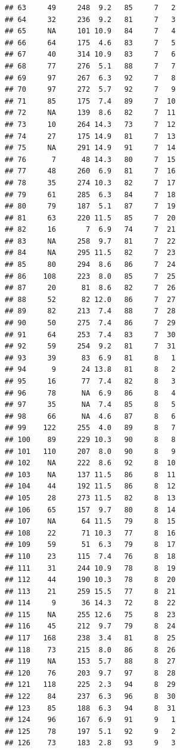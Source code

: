 \documentclass[
]{book}
\begin{document}
\begin{verbatim}
## 63     49     248  9.2   85     7   2
## 64     32     236  9.2   81     7   3
## 65     NA     101 10.9   84     7   4
## 66     64     175  4.6   83     7   5
## 67     40     314 10.9   83     7   6
## 68     77     276  5.1   88     7   7
## 69     97     267  6.3   92     7   8
## 70     97     272  5.7   92     7   9
## 71     85     175  7.4   89     7  10
## 72     NA     139  8.6   82     7  11
## 73     10     264 14.3   73     7  12
## 74     27     175 14.9   81     7  13
## 75     NA     291 14.9   91     7  14
## 76      7      48 14.3   80     7  15
## 77     48     260  6.9   81     7  16
## 78     35     274 10.3   82     7  17
## 79     61     285  6.3   84     7  18
## 80     79     187  5.1   87     7  19
## 81     63     220 11.5   85     7  20
## 82     16       7  6.9   74     7  21
## 83     NA     258  9.7   81     7  22
## 84     NA     295 11.5   82     7  23
## 85     80     294  8.6   86     7  24
## 86    108     223  8.0   85     7  25
## 87     20      81  8.6   82     7  26
## 88     52      82 12.0   86     7  27
## 89     82     213  7.4   88     7  28
## 90     50     275  7.4   86     7  29
## 91     64     253  7.4   83     7  30
## 92     59     254  9.2   81     7  31
## 93     39      83  6.9   81     8   1
## 94      9      24 13.8   81     8   2
## 95     16      77  7.4   82     8   3
## 96     78      NA  6.9   86     8   4
## 97     35      NA  7.4   85     8   5
## 98     66      NA  4.6   87     8   6
## 99    122     255  4.0   89     8   7
## 100    89     229 10.3   90     8   8
## 101   110     207  8.0   90     8   9
## 102    NA     222  8.6   92     8  10
## 103    NA     137 11.5   86     8  11
## 104    44     192 11.5   86     8  12
## 105    28     273 11.5   82     8  13
## 106    65     157  9.7   80     8  14
## 107    NA      64 11.5   79     8  15
## 108    22      71 10.3   77     8  16
## 109    59      51  6.3   79     8  17
## 110    23     115  7.4   76     8  18
## 111    31     244 10.9   78     8  19
## 112    44     190 10.3   78     8  20
## 113    21     259 15.5   77     8  21
## 114     9      36 14.3   72     8  22
## 115    NA     255 12.6   75     8  23
## 116    45     212  9.7   79     8  24
## 117   168     238  3.4   81     8  25
## 118    73     215  8.0   86     8  26
## 119    NA     153  5.7   88     8  27
## 120    76     203  9.7   97     8  28
## 121   118     225  2.3   94     8  29
## 122    84     237  6.3   96     8  30
## 123    85     188  6.3   94     8  31
## 124    96     167  6.9   91     9   1
## 125    78     197  5.1   92     9   2
## 126    73     183  2.8   93     9   3

\end{verbatim}
\end{document}
